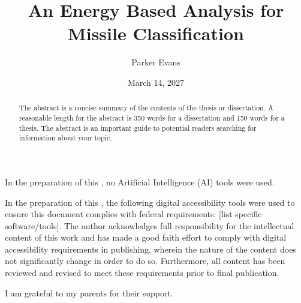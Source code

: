 \documentclass{authesis}
\title{An Energy Based Analysis for Missile Classification}
\author{Parker Evans}
\date{March 14, 2027}
\begin{document}
\begin{frontmatter}
\maketitle

\begin{abstract}
The abstract is a concise summary of the contents of the thesis or dissertation.
A reasonable length for the abstract is 350 words for a dissertation and 150 words
for a thesis. The abstract is an important guide to potential readers searching for
information about your topic.
\end{abstract}

\begin{aidisclosure}
%
In the preparation of this {\thesistype}, no Artificial Intelligence (AI) tools were used.
\end{aidisclosure}

\begin{accessibilitydisclosure}
In the preparation of this {\thesistype}, the following digital
accessibility tools were used to ensure this document complies with federal
requirements: [list specific software/tools]. The author acknowledges full responsibility
for the intellectual content of this work and has made a good faith effort to comply with
digital accessibility requirements in publishing, wherein the nature of the content does
not significantly change in order to do so. Furthermore, all content has been reviewed
and revised to meet these requirements prior to final publication.
\end{accessibilitydisclosure}

\begin{acknowledgements}
I am grateful to my parents for their support.
\end{acknowledgements}

\tableofcontents

\listoftables

\listoffigures
\end{frontmatter}








\printbibliography[heading=bibintoc,title={References}]

\appendix


\end{document}
